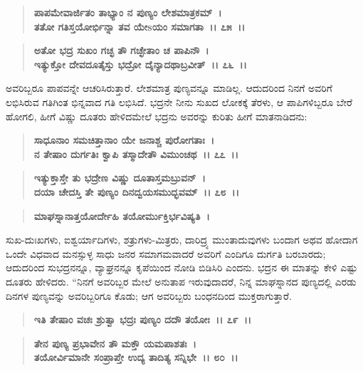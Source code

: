 \begin{verse}
\textbf{ಪಾಪಮೇವಾರ್ಜಿತಂ ತಾಭ್ಯಾಂ ನ ಪುಣ್ಯಂ ಲೇಶಮಾತ್ರಕಮ್~।}\\\textbf{ತತೋ ಗತಿಸ್ತಯೋರ್ಭಿನ್ನಾ ತವ ಯೇsಯಂ ಸಮಾಗತಾ~।। ೭೫~।। }
\end{verse}

\begin{verse}
\textbf{ಅತೋ ಭದ್ರ ಸುಖಂ ಗಚ್ಛ ತೌ ಗಚ್ಛೇತಾಂ ಚ ಪಾಪಿನೌ~।}\\\textbf{ಇತ್ಯುಕ್ತೋ ದೇವದೂತೈಸ್ತು ಭದ್ರೋ ದೈನ್ಯಾದಥಾಬ್ರವೀತ್~।। ೭೬~।।}
\end{verse}

ಅವರಿಬ್ಬರೂ ಪಾಪವನ್ನೇ ಆಚರಿಸಿರುತ್ತಾರೆ. ಲೇಶಮಾತ್ರ ಪುಣ್ಯವನ್ನೂ ಮಾಡಿಲ್ಲ. ಆದುದರಿಂದ ನಿನಗೆ ಅವರಿಗೆ ಲಭಿಸಿರುವ ಗತಿಗಿಂತ ಭಿನ್ನವಾದ ಗತಿ ಲಭಿಸಿದೆ. ಭದ್ರನೇ ನೀನು ಸುಖದ ಲೋಕಕ್ಕೆ ತೆರಳು, ಆ ಪಾಪಿಗಳಿಬ್ಬರೂ ಬೇರೆ ಹೋಗಲಿ, ಹೀಗೆ ವಿಷ್ಣು ದೂತರು ಹೇಳಿದಮೇಲೆ ಭದ್ರನು ಅವರನ್ನು ಕುರಿತು ಹೀಗೆ ಮಾತನಾಡಿದನು:

\begin{verse}
\textbf{ಸಾಧೂನಾಂ ಸಮಚಿತ್ತಾನಾಂ ಯೇ ಜನಾಶ್ಚ ಪುರೋಗತಾಃ~।}\\\textbf{ನ ತೇಷಾಂ ದುರ್ಗತಿಃ ಕ್ವಾಪಿ ತಸ್ಮಾದೇತೌ ವಿಮುಂಚಥ~।। ೭೭~।।} 
\end{verse}

\begin{verse}
\textbf{ಇತ್ಯುಕ್ತಾಸ್ತೇ ತು ಭದ್ರೇಣ ವಿಷ್ಣು ದೂತಾಸ್ತಮಬ್ರುವನ್~।}\\\textbf{ದಯಾ ಚೇದಸ್ತಿ ತೇ ಪುಣ್ಯಂ ದಿನದ್ವಯಸಮುದ್ಭವಮ್~।। ೭೮~।। }
\end{verse}

\begin{verse}
\textbf{ಮಾಘಸ್ನಾನಾತ್ತಯೋರ್ದೇಹಿ ತಯೋರ್ಮುಕ್ತಿರ್ಭವಿಷ್ಯತಿ~।}
\end{verse}

ಸುಖ-ದುಃಖಗಳು, ಐಶ್ವರ್ಯಾದಿಗಳು, ಶತ್ರುಗಳು-ಮಿತ್ರರು, ದಾರಿದ್ರ್ಯ ಮುಂತಾದುವುಗಳು ಬಂದಾಗ ಅಥವ ಹೋದಾಗ ಒಂದೇ ವಿಧವಾದ ಮನಸ್ಸುಳ್ಳ ಸಾಧು ಜನರ ಸಮಾಗಮವಾದರೆ ಅವರಿಗೆ ಎಂದಿಗೂ ದುರ್ಗತಿ ಬರಬಾರದು; ಆದುದರಿಂದ ಸುಭದ್ರನನ್ನೂ, ವ್ಯಾಘ್ರನನ್ನೂ ಕೃಪೆಯಿಂದ ನೋಡಿ ಬಿಡಿಸಿರಿ ಎಂದನು. ಭದ್ರನ ಈ ಮಾತನ್ನು ಕೇಳಿ ಎಷ್ಟು ದೂತರು ಹೇಳಿದರು. “ನಿನಗೆ ಅವರಿಬ್ಬರ ಮೇಲೆ ಅನುತಾಪ ಇರುವುದಾದರೆ, ನಿನ್ನ ಮಾಘ\break ಸ್ನಾನದ ಪುಣ್ಯದಲ್ಲಿ ಎರಡು ದಿನಗಳ ಪುಣ್ಯವನ್ನು ಅವರಿಬ್ಬರಿಗೂ ಕೊಡು; ಆಗ ಅವರಿಬ್ಬರು ಬಂಧನದಿಂದ ಮುಕ್ತರಾಗುತ್ತಾರೆ.

\begin{verse}
\textbf{ಇತಿ ತೇಷಾಂ ವಚಃ ಶ್ರುತ್ವಾ ಭದ್ರಃ ಪುಣ್ಯಂ ದದೌ ತಯೋಃ~।। ೭೯~।।} 
\end{verse}

\begin{verse}
\textbf{ತೇನ ಪುಣ್ಯ ಪ್ರಭಾವೇನ ತೌ ಮಕ್ತೌ ಯಮಪಾಶತಃ~।}\\\textbf{ತಯೋರ್ವಿಮಾನೇ ಸಂಪ್ರಾಪ್ತೇ ಉದ್ಯ ತಾದಿತ್ಯ ಸನ್ನಿಭೇ~।। ೮೦~।। }
\end{verse}

